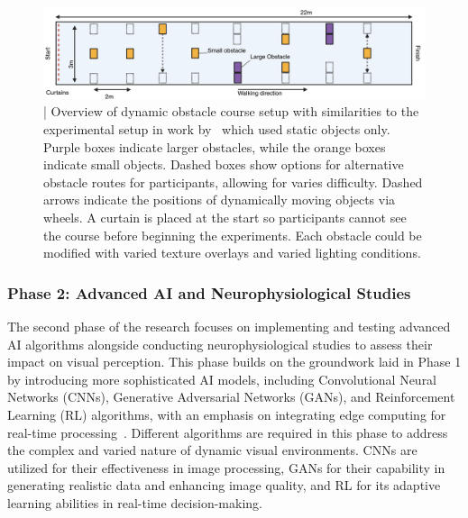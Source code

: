 \documentclass[10pt]{article}
\begin{document}
\begin{figure}[ht!]
  \centering
  \includegraphics[width=1.0\textwidth]{imgs/Obstacle_course.png}
  \caption{| Overview of dynamic obstacle course setup with similarities to the experimental
    setup in work by~\textcite{deruytervansteveninckRealworldIndoorMobility2022}
    which used static objects only. Purple boxes indicate larger obstacles,
    while the orange boxes indicate small objects. Dashed boxes show options for
    alternative obstacle routes for participants, allowing for varies
    difficulty. Dashed arrows indicate the positions of dynamically moving
    objects via wheels. A curtain is placed at the start so participants cannot
    see the course before beginning the experiments. Each obstacle could be
    modified with varied texture overlays and varied lighting conditions.}\label{fig:obstacle_course}
\end{figure}

\subsubsection*{Phase 2: Advanced AI and Neurophysiological Studies}
The second phase of the research focuses on implementing and testing advanced AI
algorithms alongside conducting neurophysiological studies to assess their
impact on visual perception. This phase builds on the groundwork laid in Phase 1
by introducing more sophisticated AI models, including Convolutional Neural
Networks (CNNs), Generative Adversarial Networks (GANs), and Reinforcement
Learning (RL) algorithms, with an emphasis on integrating edge computing for
real-time
processing~\parencite{granleyAdaptingBrainLikeNeural2022,elnabawyPVGANGenerativeAdversarial2022}.
Different algorithms are required in this phase to address the complex and
varied nature of dynamic visual environments. CNNs are utilized for their
effectiveness in image processing, GANs for their capability in generating
realistic data and enhancing image quality, and RL for its adaptive learning
abilities in real-time decision-making.
\end{document}
